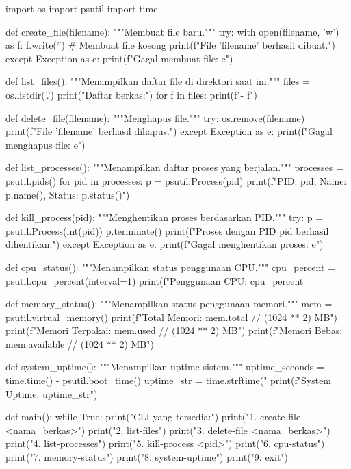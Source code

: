 \documentclass[12pt]{article}
\begin{document}
\begin{python}
import os
import psutil
import time

def create_file(filename):
    """Membuat file baru."""
    try:
        with open(filename, 'w') as f:
            f.write('')  # Membuat file kosong
        print(f"File '{filename}' berhasil dibuat.")
    except Exception as e:
        print(f"Gagal membuat file: {e}")

def list_files():
    """Menampilkan daftar file di direktori saat ini."""
    files = os.listdir('.')
    print("Daftar berkas:")
    for f in files:
        print(f"- {f}")

def delete_file(filename):
    """Menghapus file."""
    try:
        os.remove(filename)
        print(f"File '{filename}' berhasil dihapus.")
    except Exception as e:
        print(f"Gagal menghapus file: {e}")

def list_processes():
    """Menampilkan daftar proses yang berjalan."""
    processes = psutil.pids()
    for pid in processes:
        p = psutil.Process(pid)
        print(f"PID: {pid}, Name: {p.name()}, Status: {p.status()}")

def kill_process(pid):
    """Menghentikan proses berdasarkan PID."""
    try:
        p = psutil.Process(int(pid))
        p.terminate()
        print(f"Proses dengan PID {pid} berhasil dihentikan.")
    except Exception as e:
        print(f"Gagal menghentikan proses: {e}")

def cpu_status():
    """Menampilkan status penggunaan CPU."""
    cpu_percent = psutil.cpu_percent(interval=1)
    print(f"Penggunaan CPU: {cpu_percent}%

def memory_status():
    """Menampilkan status penggunaan memori."""
    mem = psutil.virtual_memory()
    print(f"Total Memori: {mem.total // (1024 ** 2)} MB")
    print(f"Memori Terpakai: {mem.used // (1024 ** 2)} MB")
    print(f"Memori Bebas: {mem.available // (1024 ** 2)} MB")

def system_uptime():
    """Menampilkan uptime sistem."""
    uptime_seconds = time.time() - psutil.boot_time()
    uptime_str = time.strftime("%
    print(f"System Uptime: {uptime_str}")

def main():
    while True:
        print("\nPerintah CLI yang tersedia:")
        print("1. create-file <nama_berkas>")
        print("2. list-files")
        print("3. delete-file <nama_berkas>")
        print("4. list-processes")
        print("5. kill-process <pid>")
        print("6. cpu-status")
        print("7. memory-status")
        print("8. system-uptime")
        print("9. exit")


\end{python}
\end{document}
